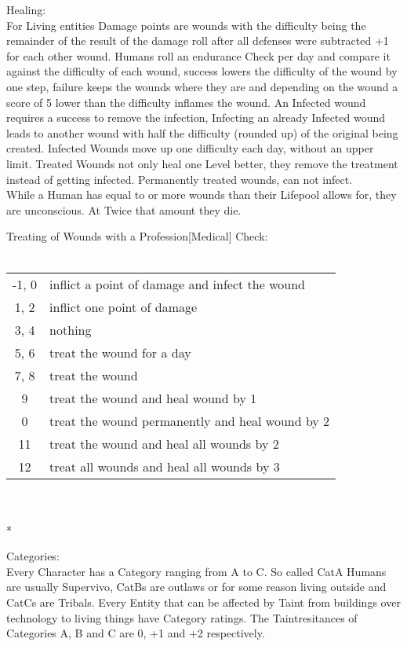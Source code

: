 \documentclass{article}
\begin{document}
    Healing:\\
    For Living entities Damage points are wounds with the difficulty being the remainder of the result of the damage roll
    after all defenses were subtracted +1 for each other wound.
    Humans roll an endurance Check per day and compare it against the difficulty of each wound, success lowers the
    difficulty of the wound by one step, failure keeps the wounds where they are and depending on the wound a score of 5
    lower than the difficulty inflames the wound.
    An Infected wound requires a success to remove the infection, Infecting an already Infected wound leads to another wound
    with half the difficulty (rounded up) of the original being created. Infected Wounds move up one difficulty each day,
    without an upper limit.
    Treated Wounds not only heal one Level better, they remove the treatment instead of getting infected. Permanently
    treated wounds, can not infect. \\
    While a Human has equal to or more wounds than their Lifepool allows for, they are unconscious. At Twice that amount
    they die.

    Treating of Wounds with a Profession[Medical] Check:\\\\
    \begin{tabular}{cl}
        -1, 0 & inflict a point of damage and infect the wound\\
        1, 2 & inflict one point of damage\\
        3, 4 & nothing\\
        5, 6 & treat the wound for a day\\
        7, 8 & treat the wound  \\
        9 & treat the wound and heal wound by 1 \\
        0 & treat the wound permanently and heal wound by 2 \\
        11 & treat the wound and heal all wounds by 2\\
        12 & treat all wounds and heal all wounds by 3\\

    \end{tabular}\\\\*


    Categories:\\
    Every Character has a Category ranging from A to C. So called CatA Humans are usually Supervivo, CatBs are outlaws or
    for some reason living outside and CatCs are Tribals.
    Every Entity that can be affected by Taint from buildings over technology to living things have Category ratings.
    The Taintresitances of Categories A, B and C are 0, +1 and +2 respectively.\\
\end{document}
